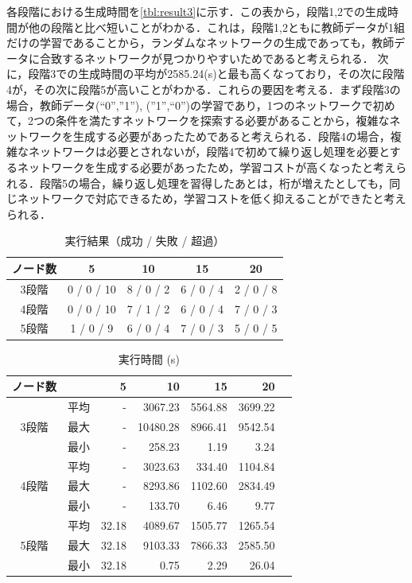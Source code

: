 \documentclass[exploratorypaper]{jsaiart} %
\begin{document}
各段階における生成時間を\ref{tbl:result3}に示す．この表から，段階1,2での生成時間が他の段階と比べ短いことがわかる．これは，段階1,2ともに教師データが1組だけの学習であることから，ランダムなネットワークの生成であっても，教師データに合致するネットワークが見つかりやすいためであると考えられる．
次に，段階3での生成時間の平均が2585.24(s)と最も高くなっており，その次に段階4が，その次に段階5が高いことがわかる．これらの要因を考える．まず段階3の場合，教師データ(“0”,”1”), (”1”,“0”)の学習であり，1つのネットワークで初めて，2つの条件を満たすネットワークを探索する必要があることから，複雑なネットワークを生成する必要があったためであると考えられる．段階4の場合，複雑なネットワークは必要とされないが，段階4で初めて繰り返し処理を必要とするネットワークを生成する必要があったため，学習コストが高くなったと考えられる．段階5の場合，繰り返し処理を習得したあとは，桁が増えたとしても，同じネットワークで対応できるため，学習コストを低く抑えることができたと考えられる．


\begin{table}[htbp]
\caption{実行結果（成功 / 失敗 / 超過）}
\label{tbl:result1}
\begin{tabular}{c|cccc}
    ノード数&	5&	10&	15&	20\\
    \hline \hline
    3段階&	0 / 0 / 10&	8 / 0 / 2&	6 / 0 / 4&	2 / 0 / 8\\
    4段階&	0 / 0 / 10&	7 / 1 / 2&	6 / 0 / 4&	7 / 0 / 3\\
    5段階&	1 / 0 / 9&	6 / 0 / 4&	7 / 0 / 3&	5 / 0 / 5\\
    \hline
\end{tabular}
\end{table}

\begin{table}[htbp]
\caption{実行時間 (s)}
\label{tbl:result2}
\begin{tabular}{c|crrrrr}
    ノード数& & 5&	10&   15&	 20\\
    \hline \hline
         & 平均& -&  3067.23& 5564.88&  3699.22\\
    3段階& 最大& -& 10480.28& 8966.41&  9542.54\\
         & 最小& -&   258.23&    1.19&	  3.24\\
    \hline
         & 平均& -&  3023.63&   334.40& 1104.84\\
    4段階& 最大& -&  8293.86&  1102.60& 2834.49\\
         & 最小& -&   133.70&     6.46&    9.77\\
    \hline
         & 平均& 32.18&  4089.67&  1505.77& 1265.54\\
    5段階& 最大& 32.18&  9103.33&  7866.33& 2585.50\\
         & 最小& 32.18&     0.75&     2.29&   26.04\\
    \hline
\end{tabular}
\end{table}
\end{document}
